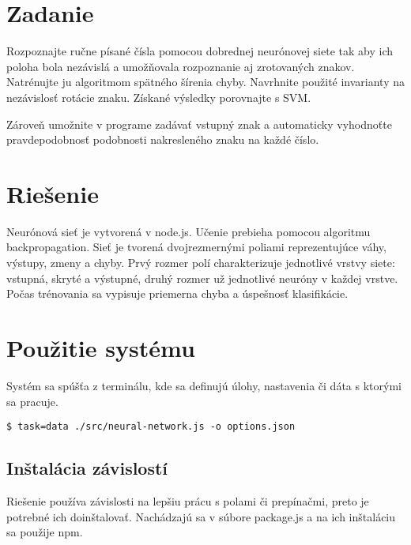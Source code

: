 \section{Zadanie} %
\label{sec:zadanie}

Rozpoznajte ručne písané čísla pomocou dobrednej neurónovej siete tak aby ich poloha bola nezávislá a umožňovala rozpoznanie aj zrotovaných znakov. Natrénujte ju algoritmom spätného šírenia chyby. Navrhnite použité invarianty na nezávislosť rotácie znaku. Získané výsledky porovnajte s SVM.

Zároveň umožnite v programe zadávať vstupný znak a automaticky vyhodnoťte pravdepodobnosť podobnosti nakresleného znaku na každé číslo.


\section{Riešenie} %
\label{sec:rie_enie}

Neurónová sieť je vytvorená v node.js. Učenie prebieha pomocou algoritmu backpropagation. Sieť je tvorená dvojrezmernými poliami reprezentujúce váhy, výstupy, zmeny a chyby. Prvý rozmer polí charakterizuje jednotlivé vrstvy siete: vstupná, skryté a výstupné, druhý rozmer už jednotlivé neuróny v každej vrstve. Počas trénovania sa vypisuje priemerna chyba a úspešnosť klasifikácie.


\section{Použitie systému} %
\label{sec:pou_itie_syst_mu}

Systém sa spúšťa z terminálu, kde sa definujú úlohy, nastavenia či dáta s ktorými sa pracuje.

\begin{verbatim}
$ task=data ./src/neural-network.js -o options.json
\end{verbatim}

\subsection{Inštalácia závislostí} %
\label{sub:in_tal_cia}

Riešenie používa závislosti na lepšiu prácu s polami či prepínačmi, preto je potrebné ich doinštalovať. Nachádzajú sa v súbore package.js a na ich inštaláciu sa použije npm.

